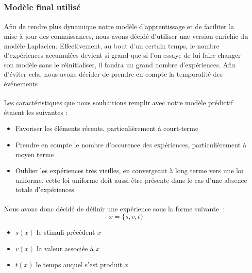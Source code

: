 \subsubsection{Modèle final utilisé}
\paragraph{}
Afin de rendre plus dynamique notre modèle d'apprentissage et de faciliter la
mise à jour des connaissances, nous avons décidé d'utiliser une version
enrichie du modèle Laplacien. Effectivement, au bout d'un certain temps,
le nombre d'expériences accumulées devient si grand que si l'on essaye de lui
faire changer son modèle sans le réinitialiser, il faudra un grand nombre
d'expériences. Afin d'éviter cela, nous avons décider de prendre en compte la
temporalité des événements

\paragraph{}
Les caractéristiques que nous souhaitions remplir avec notre modèle prédictif
étaient les suivantes :
\begin{itemize}
\item Favoriser les éléments récents, particulièrement à court-terme
\item Prendre en compte le nombre d'occurence des expériences,
      particulièrement à moyen terme
\item Oublier les expériences très vieilles, en convergeant à long terme vers
      une loi uniforme, cette loi uniforme doit aussi être présente dans le
      cas d'une absence totale d'expériences.
\end{itemize}

\paragraph{}
Nous avons donc décidé de définir une expérience sous
la forme suivante~:
$$x = \{s, v, t\}$$
\begin{itemize}
\item $s(x)$ le stimuli précédent $x$
\item $v(x)$ la valeur associée à $x$
\item $t(x)$ le temps auquel s'est produit $x$
\end{itemize}

